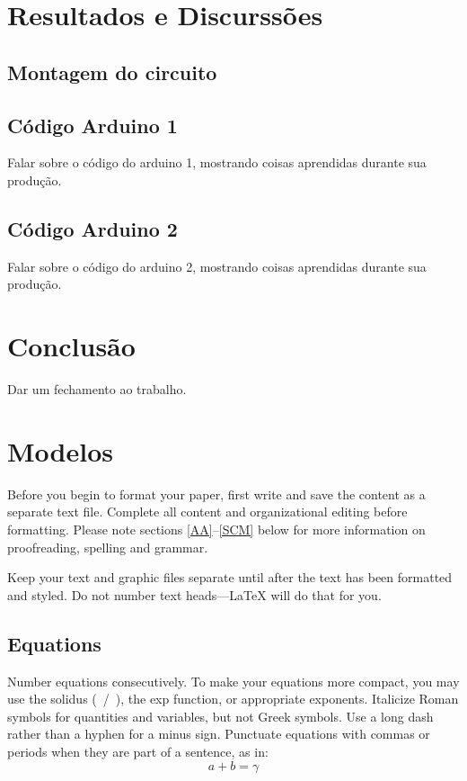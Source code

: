 \documentclass[conference]{IEEEtran}
\begin{document}
\section{Resultados e Discurssões}

\subsection{Montagem do circuito}

\subsection{Código Arduino 1}

Falar sobre o código do arduino 1,
mostrando coisas aprendidas durante sua produção.

\subsection{Código Arduino 2}

Falar sobre o código do arduino 2,
mostrando coisas aprendidas durante sua produção.

\section{Conclusão}
Dar um fechamento ao trabalho.







\section{Modelos}
Before you begin to format your paper, first write and save the content as a
separate text file. Complete all content and organizational editing before
formatting. Please note sections \ref{AA}--\ref{SCM} below for more information on
proofreading, spelling and grammar.

Keep your text and graphic files separate until after the text has been
formatted and styled. Do not number text heads---{\LaTeX} will do that
for you.

\subsection{Equations}
Number equations consecutively. To make your
equations more compact, you may use the solidus (~/~), the exp function, or
appropriate exponents. Italicize Roman symbols for quantities and variables,
but not Greek symbols. Use a long dash rather than a hyphen for a minus
sign. Punctuate equations with commas or periods when they are part of a
sentence, as in:
\begin{equation}
    a+b=\gamma\label{eq}
\end{equation}
\end{document}
